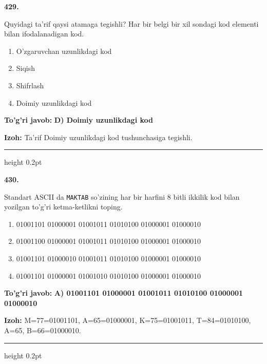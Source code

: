 \documentclass[10pt,a4paper,oneside]{article}
\begin{document}
\noindent\textbf{\color{ink}429.}
\par
Quyidagi ta'rif qaysi atamaga tegishli? Har bir belgi bir xil sondagi kod elementi bilan ifodalanadigan kod.
\begin{enumerate}[label=\Alph*),leftmargin=9mm]
\item O'zgaruvchan uzunlikdagi kod
\item Siqish
\item Shifrlash
\item Doimiy uzunlikdagi kod
\end{enumerate}
\begin{tcolorbox}[enhanced,breakable,colback=teal!4,colframe=teal!50!black,boxrule=0.5pt,arc=1.1mm,left=3mm,right=3mm,top=1.7mm,bottom=1.7mm,before skip=2mm,after skip=2mm]
\textbf{\color{teal}To'g'ri javob:} \textbf{D) Doimiy uzunlikdagi kod}
\par\smallskip
\textbf{Izoh:} Ta'rif Doimiy uzunlikdagi kod tushunchasiga tegishli.
\end{tcolorbox}
\vspace{2mm}\hrule height 0.2pt \vspace{3mm}

\noindent\textbf{\color{ink}430.}
\par
Standart ASCII da \texttt{MAKTAB} so'zining har bir harfini 8 bitli ikkilik kod bilan yozilgan to'g'ri ketma-ketlikni toping.
\begin{enumerate}[label=\Alph*),leftmargin=9mm]
\item 01001101 01000001 01001011 01010100 01000001 01000010
\item 01001100 01000001 01001011 01010100 01000001 01000010
\item 01001101 01000010 01001011 01010100 01000001 01000010
\item 01001101 01000001 01001010 01010100 01000001 01000010
\end{enumerate}
\begin{tcolorbox}[enhanced,breakable,colback=teal!4,colframe=teal!50!black,boxrule=0.5pt,arc=1.1mm,left=3mm,right=3mm,top=1.7mm,bottom=1.7mm,before skip=2mm,after skip=2mm]
\textbf{\color{teal}To'g'ri javob:} \textbf{A) 01001101 01000001 01001011 01010100 01000001 01000010}
\par\smallskip
\textbf{Izoh:} M=77=01001101, A=65=01000001, K=75=01001011, T=84=01010100, A=65, B=66=01000010.
\end{tcolorbox}
\vspace{2mm}\hrule height 0.2pt \vspace{3mm}
\end{document}
